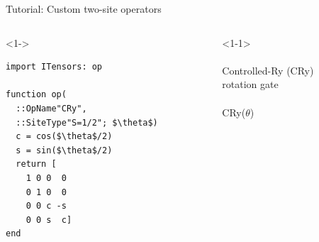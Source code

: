 \begin{frame}[fragile]{Tutorial: Custom two-site operators}

\begin{columns}

\begin{column}{5cm}

\begin{onlyenv}<1->

\begin{lstlisting}[language=JuliaLocal, style=julia, mathescape, basicstyle=\scriptsize\ttfamily]
import ITensors: op

function op(
  ::OpName"CRy",
  ::SiteType"S=1/2"; $\theta$)
  c = cos($\theta$/2)
  s = sin($\theta$/2)
  return [
    1 0 0  0
    0 1 0  0
    0 0 c -s
    0 0 s  c]
end



\end{lstlisting}

\end{onlyenv}

\end{column}

\begin{column}{5cm}

\begin{onlyenv}<1-1>
~\\
~\\
Controlled-Ry (CRy) \\
rotation gate \\
~\\
CRy($\theta$) \\
~\\
~\\
~\\
~\\
~\\
~\\
~\\
~\\
~\\
~\\
\end{onlyenv}


\end{column}
\end{columns}
\end{frame}
